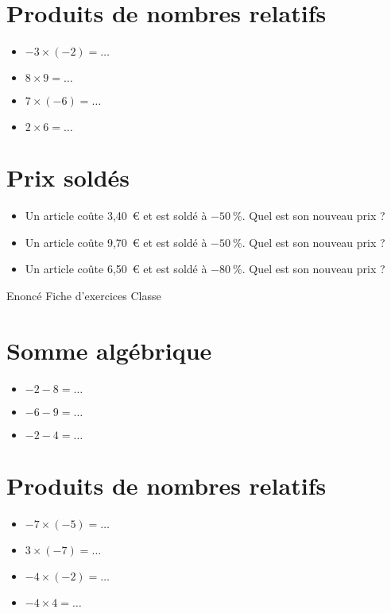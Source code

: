 \documentclass[a4paper,11pt,fleqn]{article}
\begin{document}
\section{Produits de nombres relatifs}
\begin{itemize}

  \item $-3\times(-2)=\ldots$
  \item $8\times9=\ldots$
  \item $7\times(-6)=\ldots$
  \item $2\times6=\ldots$
\end{itemize}


\section{Prix soldés}
\begin{itemize}

  \item Un article coûte 3,40~€ et est soldé à $-50~\%$. Quel est son nouveau prix ?
  \item Un article coûte 9,70~€ et est soldé à $-50~\%$. Quel est son nouveau prix ?
  \item Un article coûte 6,50~€ et est soldé à $-80~\%$. Quel est son nouveau prix ?
\end{itemize}
\newpage
\setcounter{exo}{0}
\setcounter{section}{0}
{Enoncé} \hfill {\huge Fiche d'exercices } \hfill {Classe}

\section{Somme algébrique}
\begin{itemize}

  \item $-2 -8=\ldots$
  \item $-6 -9=\ldots$
  \item $-2 -4=\ldots$
\end{itemize}


\section{Produits de nombres relatifs}
\begin{itemize}

  \item $-7\times(-5)=\ldots$
  \item $3\times(-7)=\ldots$
  \item $-4\times(-2)=\ldots$
  \item $-4\times4=\ldots$
\end{itemize}
\end{document}
